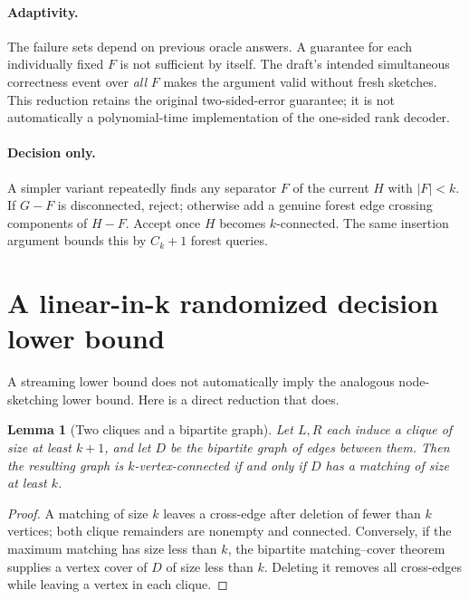 \documentclass[11pt]{article}
\newtheorem{lemma}[theorem]{Lemma}
\theoremstyle{remark}\newtheorem{remark}[theorem]{Remark}
\begin{document}
\paragraph{Adaptivity.}
The failure sets depend on previous oracle answers. A guarantee for each individually fixed $F$ is not sufficient by itself. The draft's intended simultaneous correctness event over \emph{all} $F$ makes the argument valid without fresh sketches. This reduction retains the original two-sided-error guarantee; it is not automatically a polynomial-time implementation of the one-sided rank decoder.

\paragraph{Decision only.}
A simpler variant repeatedly finds any separator $F$ of the current $H$ with $|F|<k$. If $G-F$ is disconnected, reject; otherwise add a genuine forest edge crossing components of $H-F$. Accept once $H$ becomes $k$-connected. The same insertion argument bounds this by $C_k+1$ forest queries.

\section{A linear-in-k randomized decision lower bound}
A streaming lower bound does not automatically imply the analogous node-sketching lower bound. Here is a direct reduction that does.

\begin{lemma}[Two cliques and a bipartite graph]\label{lem:cliques}
Let $L,R$ each induce a clique of size at least $k+1$, and let $D$ be the bipartite graph of edges between them. Then the resulting graph is $k$-vertex-connected if and only if $D$ has a matching of size at least $k$.
\end{lemma}
\begin{proof}
A matching of size $k$ leaves a cross-edge after deletion of fewer than $k$ vertices; both clique remainders are nonempty and connected. Conversely, if the maximum matching has size less than $k$, the bipartite matching--cover theorem supplies a vertex cover of $D$ of size less than $k$. Deleting it removes all cross-edges while leaving a vertex in each clique.
\end{proof}
\end{document}
